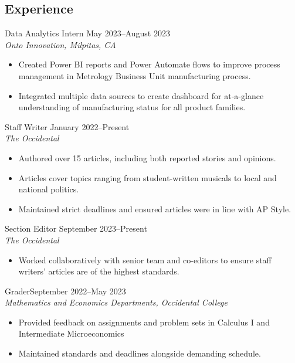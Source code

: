 \documentclass[margin, 10pt]{res} %
\begin{document}
\begin{resume}
\section{\sc Experience}

{Data Analytics Intern} \hfill May 2023--August 2023 \\
\textit{Onto Innovation, Milpitas, CA}

\begin{itemize} \itemsep -2pt %
\item Created Power BI reports and Power Automate flows to improve process management in Metrology Business Unit manufacturing process.
\item Integrated multiple data sources to create dashboard for at-a-glance understanding of manufacturing status for all product families.
\end{itemize}
 
Staff Writer \hfill January 2022--Present \\
\textit{The Occidental} 
\begin{itemize} \itemsep -2pt
\item Authored over 15 articles, including both reported stories and opinions.
\item Articles cover topics ranging from student-written musicals to local and national politics.
\item Maintained strict deadlines and ensured articles were in line with AP Style.
\end{itemize} 

Section Editor \hfill September 2023--Present \\
\textit{The Occidental}
\begin{itemize}\itemsep -2pt
  \item Worked collaboratively with senior team and co-editors to ensure staff writers' articles are of the highest standards.
\end{itemize} 

Grader\hfill September 2022--May 2023\\
\textit{Mathematics and Economics Departments, Occidental College}
\begin{itemize}\itemsep -2pt
  \item Provided feedback on assignments and problem sets in Calculus I and Intermediate Microeconomics
  \item Maintained standards and deadlines alongside demanding schedule.
\end{itemize}


\end{resume}
\end{document}
